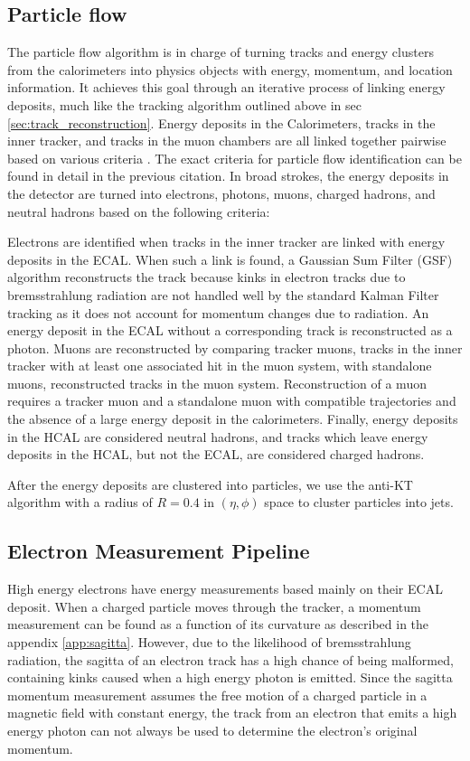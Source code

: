   \subsection{Particle flow} \label{sec:particle_flow}
    The particle flow algorithm is in charge of turning tracks and energy clusters from the calorimeters into physics objects with energy, momentum, and location information. It achieves this goal through an iterative process of linking energy deposits, much like the tracking algorithm outlined above in sec \ref{sec:track_reconstruction}. Energy deposits in the Calorimeters, tracks in the inner tracker, and tracks in the muon chambers are all linked together pairwise based on various criteria \cite[sec. 4]{cms_particleflow}. The exact criteria for particle flow identification can be found in detail in the previous citation. In broad strokes, the energy deposits in the detector are turned into electrons, photons, muons, charged hadrons, and neutral hadrons based on the following criteria:

    Electrons are identified when tracks in the inner tracker are linked with energy deposits in the ECAL. When such a link is found, a Gaussian Sum Filter (GSF) \cite{cms_gsf} algorithm reconstructs the track because kinks in electron tracks due to bremsstrahlung radiation are not handled well by the standard Kalman Filter tracking as it does not account for momentum changes due to radiation. An energy deposit in the ECAL without a corresponding track is reconstructed as a photon. Muons are reconstructed by comparing tracker muons, tracks in the inner tracker with at least one associated hit in the muon system, with standalone muons, reconstructed tracks in the muon system. Reconstruction of a muon requires a tracker muon and a standalone muon with compatible trajectories and the absence of a large energy deposit in the calorimeters. Finally, energy deposits in the HCAL are considered neutral hadrons, and tracks which leave energy deposits in the HCAL, but not the ECAL, are considered charged hadrons.

    After the energy deposits are clustered into particles, we use the anti-KT algorithm with a radius of $R=0.4$ in $(\eta, \phi)$ space to cluster particles into jets.\cite{cms_jet_performance} 


  \subsection{Electron Measurement Pipeline} \label{sec:electron_measurement_pipeline}
    High energy electrons have energy measurements based mainly on their ECAL deposit. When a charged particle moves through the tracker, a momentum measurement can be found as a function of its curvature as described in the appendix \ref{app:sagitta}. However, due to the likelihood of bremsstrahlung radiation, the sagitta of an electron track has a high chance of being malformed, containing kinks caused when a high energy photon is emitted. Since the sagitta momentum measurement assumes the free motion of a charged particle in a magnetic field with constant energy, the track from an electron that emits a high energy photon can not always be used to determine the electron's original momentum.

